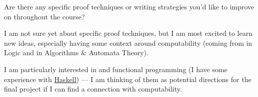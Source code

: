 \begin{problem}
  Are there any specific proof techniques or writing strategies
  you’d like to improve on throughout the course?
  \begin{answer}
    I am not sure yet about specific proof techniques,
    but I am most excited to learn new ideas,
    especially having some context around
    computability (coming from  in Logic
    and  in Algorithms \& Automata Theory).

    \step
    I am particularly interested in
    \href{https://plato.stanford.edu/entries/lambda-calculus/}{}
    and functional programming
    (I have some experience with \href{https://www.haskell.org/}{Haskell}) ---
    I am thinking of them as potential directions for the final project
    if I can find a connection with computability.
  \end{answer}
\end{problem}
